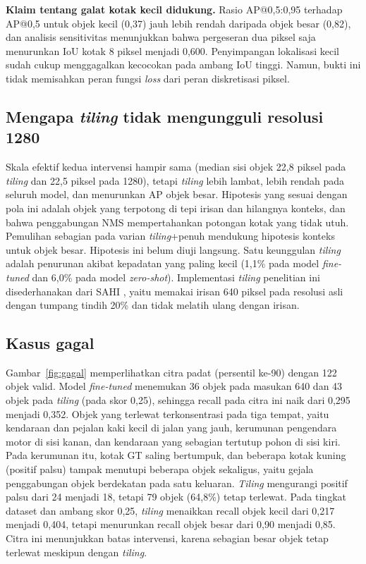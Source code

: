 \documentclass[conference,a4paper]{IEEEtran}
\begin{document}
\textbf{Klaim tentang galat kotak kecil didukung.} Rasio AP@0,5:0,95 terhadap AP@0,5 untuk objek kecil (0,37) jauh lebih rendah daripada objek besar (0,82), dan analisis sensitivitas menunjukkan bahwa pergeseran dua piksel saja menurunkan IoU kotak 8 piksel menjadi 0,600. Penyimpangan lokalisasi kecil sudah cukup menggagalkan kecocokan pada ambang IoU tinggi. Namun, bukti ini tidak memisahkan peran fungsi \textit{loss} dari peran diskretisasi piksel.

\subsection{Mengapa \textit{tiling} tidak mengungguli resolusi 1280}
Skala efektif kedua intervensi hampir sama (median sisi objek 22,8 piksel pada \textit{tiling} dan 22,5 piksel pada 1280), tetapi \textit{tiling} lebih lambat, lebih rendah pada seluruh model, dan menurunkan AP objek besar. Hipotesis yang sesuai dengan pola ini adalah objek yang terpotong di tepi irisan dan hilangnya konteks, dan bahwa penggabungan NMS mempertahankan potongan kotak yang tidak utuh. Pemulihan sebagian pada varian \textit{tiling}+penuh mendukung hipotesis konteks untuk objek besar. Hipotesis ini belum diuji langsung. Satu keunggulan \textit{tiling} adalah penurunan akibat kepadatan yang paling kecil (1,1\% pada model \textit{fine-tuned} dan 6,0\% pada model \textit{zero-shot}). Implementasi \textit{tiling} penelitian ini disederhanakan dari SAHI \cite{akyon2022sahi}, yaitu memakai irisan 640 piksel pada resolusi asli dengan tumpang tindih 20\% dan tidak melatih ulang dengan irisan.

\subsection{Kasus gagal}
Gambar~\ref{fig:gagal} memperlihatkan citra padat (persentil ke-90) dengan 122 objek valid. Model \textit{fine-tuned} menemukan 36 objek pada masukan 640 dan 43 objek pada \textit{tiling} (pada skor 0,25), sehingga recall pada citra ini naik dari 0,295 menjadi 0,352. Objek yang terlewat terkonsentrasi pada tiga tempat, yaitu kendaraan dan pejalan kaki kecil di jalan yang jauh, kerumunan pengendara motor di sisi kanan, dan kendaraan yang sebagian tertutup pohon di sisi kiri. Pada kerumunan itu, kotak GT saling bertumpuk, dan beberapa kotak kuning (positif palsu) tampak menutupi beberapa objek sekaligus, yaitu gejala penggabungan objek berdekatan pada satu keluaran. \textit{Tiling} mengurangi positif palsu dari 24 menjadi 18, tetapi 79 objek (64,8\%) tetap terlewat. Pada tingkat dataset dan ambang skor 0,25, \textit{tiling} menaikkan recall objek kecil dari 0,217 menjadi 0,404, tetapi menurunkan recall objek besar dari 0,90 menjadi 0,85. Citra ini menunjukkan batas intervensi, karena sebagian besar objek tetap terlewat meskipun dengan \textit{tiling}.
\end{document}
